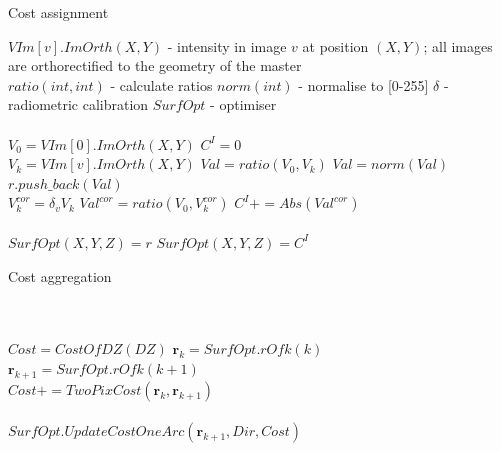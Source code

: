 \documentclass[journal]{IEEEtran}
\begin{document}
\begin{algorithm}
\caption{Cost assignment}
\begin{algorithmic}
\State  $VIm[v].ImOrth(X,Y)$ - intensity in image $v$ at position $(X,Y)$; all images are orthorectified to the geometry of the master\\
\State  $ratio(int,int)$ - calculate ratios
\State  $norm(int)$ - normalise to [0-255]
\State  $\delta$ - radiometric calibration
\State  $SurfOpt$ - optimiser\\

 \\

\State $V_0=VIm[0].ImOrth(X,Y)$
\State $C^I=0$
 \\
\State $V_k=VIm[v].ImOrth(X,Y)$
\State $Val=ratio(V_0,V_k)$
\State $Val=norm(Val)$
\State $r.push\_back( Val )$\\

\State $V_k^{cor} = \delta_v V_k$
\State $Val^{cor} = ratio(V_0,V_k^{cor})$
\State $C^I+=Abs(Val^{cor})$ 
\EndFor \\
\\
\State  $ SurfOpt(X,Y,Z) = r $
\State  $ SurfOpt(X,Y,Z) = C^I$ \\

\EndFor
\EndFor 
\EndFor  

\end{algorithmic}\label{alg:costPix}
\end{algorithm}
%
% 
\begin{algorithm*}
\caption{Cost aggregation}
\begin{algorithmic} 

  
 \\

 \\ 

\State $Cost = CostOfDZ(DZ)$ 
\State $\textbf{r}_{k} = SurfOpt.rOfk(k)$  
\State $\textbf{r}_{k+1} = SurfOpt.rOfk(k+1)$\\

\State $Cost += TwoPixCost(\textbf{r}_{k},\textbf{r}_{k+1})$\\
\\
\State $SurfOpt.UpdateCostOneArc(\textbf{r}_{k+1},Dir,Cost)$\\

 

\EndFor
\EndFor 
\EndFor 
\EndFor  
\EndFor

\end{algorithmic}\label{alg:costAggreg}
\end{algorithm*}
\end{document}
